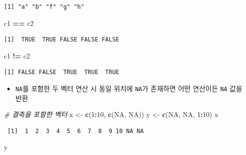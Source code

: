 \documentclass[
  11pt,
]{krantz}
\newenvironment{Shaded}{\begin{snugshade}}{\end{snugshade}}
\newcommand{\CommentTok}[1]{\textcolor[rgb]{0.37,0.37,0.37}{\textit{#1}}}
\newcommand{\DecValTok}[1]{\textcolor[rgb]{0.06,0.06,0.06}{#1}}
\newcommand{\KeywordTok}[1]{\textcolor[rgb]{0.27,0.27,0.27}{\textbf{#1}}}
\newcommand{\NormalTok}[1]{#1}
\newcommand{\OperatorTok}[1]{\textcolor[rgb]{0.43,0.43,0.43}{\textbf{#1}}}
\newcommand{\OtherTok}[1]{\textcolor[rgb]{0.37,0.37,0.37}{#1}}
\newcommand{\StringTok}[1]{\textcolor[rgb]{0.5,0.5,0.5}{#1}}
\providecommand{\tightlist}{%
  \setlength{\itemsep}{0pt}\setlength{\parskip}{0pt}}
\begin{document}
\begin{verbatim}
[1] "a" "b" "f" "g" "h"
\end{verbatim}

\begin{Shaded}
\begin{Highlighting}[]
\NormalTok{c1 }\OperatorTok{==}\StringTok{ }\NormalTok{c2}
\end{Highlighting}
\end{Shaded}

\begin{verbatim}
[1]  TRUE  TRUE FALSE FALSE FALSE
\end{verbatim}

\begin{Shaded}
\begin{Highlighting}[]
\NormalTok{c1 }\OperatorTok{!=}\StringTok{ }\NormalTok{c2}
\end{Highlighting}
\end{Shaded}

\begin{verbatim}
[1] FALSE FALSE  TRUE  TRUE  TRUE
\end{verbatim}

\normalsize

\begin{itemize}
\tightlist
\item
  \texttt{NA}를 포함한 두 벡터 연산 시 동일 위치에 \texttt{NA}가 존재하면 어떤 연산이든 \texttt{NA} 값을 반환
\end{itemize}

\footnotesize

\begin{Shaded}
\begin{Highlighting}[]
\CommentTok{# 결측을 포함한 벡터}
\NormalTok{x <-}\StringTok{ }\KeywordTok{c}\NormalTok{(}\DecValTok{1}\OperatorTok{:}\DecValTok{10}\NormalTok{, }\KeywordTok{c}\NormalTok{(}\OtherTok{NA}\NormalTok{, }\OtherTok{NA}\NormalTok{))}
\NormalTok{y <-}\StringTok{ }\KeywordTok{c}\NormalTok{(}\OtherTok{NA}\NormalTok{, }\OtherTok{NA}\NormalTok{, }\DecValTok{1}\OperatorTok{:}\DecValTok{10}\NormalTok{)}
\NormalTok{x}
\end{Highlighting}
\end{Shaded}

\begin{verbatim}
 [1]  1  2  3  4  5  6  7  8  9 10 NA NA
\end{verbatim}

\begin{Shaded}
\begin{Highlighting}[]
\NormalTok{y}
\end{Highlighting}
\end{Shaded}
\end{document}

